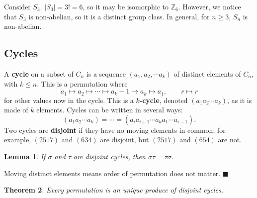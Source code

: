\documentclass[letter-paper]{tufte-book}
\newtheorem{theorem}{\color{pastel-blue}Theorem}[section]
\newtheorem{lemma}[theorem]{\color{pastel-blue}Lemma}
\newenvironment{proof}[1][Proof]{\begin{trivlist}
\item[\hskip \labelsep {\bfseries #1}]}{\end{trivlist}}
\newcommand\Def[1]{\textbf{#1}}
\newcommand{\qed}{\hfill$\blacksquare$}
\begin{document}
Consider $S_3$. $|S_3|=3!=6$, so it may be isomorphic to
$\mathbb{Z}_6$. However, we notice that $S_3$ is non-abelian, so it is a
distinct group class. In general, for $n\geq3$, $S_n$ is non-abelian.


\subsection{Cycles}

A \Def{cycle} on a subset of $C_n$ is a sequence $(a_1,a_2,\cdots a_k)$
of distinct elements of $C_n$, with $k\leq n$. This is a permutation where
\begin{equation*}
  a_1\mapsto a_2\mapsto\cdots\mapsto a_k-1\mapsto a_k\mapsto a_1,\qquad
  r\mapsto r
\end{equation*}
for other values now in the cycle. This is a \Def{$k$-cycle}, denoted
$(a_1 a_2 \cdots a_k)$, as it is made of $k$ elements. Cycles can be written
in several ways:
\begin{equation*}
  (a_1 a_2 \cdots a_k)=\cdots=(a_i a_{i+1} \cdots a_k a_1 \cdots a_{i-1}).
\end{equation*}
Two cycles are \Def{disjoint} if they have no moving elements in common;
for example, $(2517)$ and $(634)$ are disjoint, but $(2517)$ and $(654)$
are not.
\begin{lemma}
  If $\sigma$ and $\tau$ are disjoint cycles, then $\sigma\tau=\tau\sigma$.
\end{lemma}
\begin{proof}
  Moving distinct elements means order of permutation does not matter. \qed
\end{proof}
\begin{theorem}
  Every permutation is an unique produce of disjoint cycles.
\end{theorem}
\end{document}
